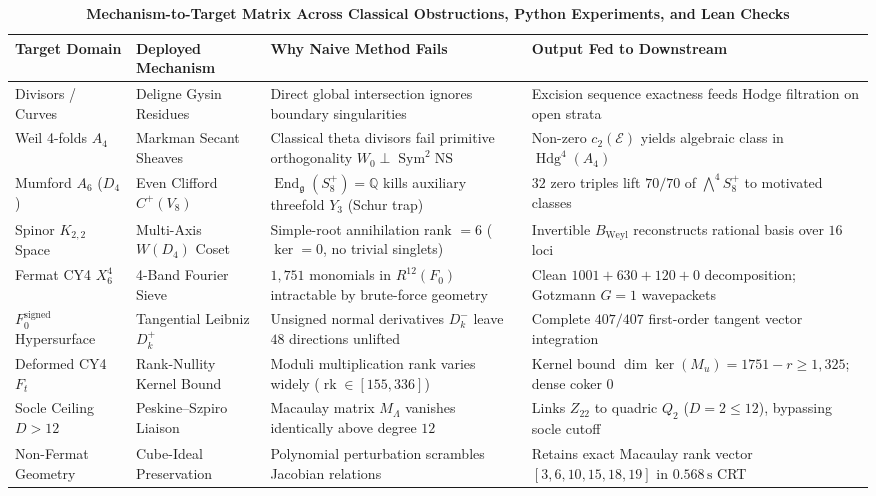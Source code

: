 \documentclass[11pt,a4paper]{article}
\theoremstyle{definition}
\theoremstyle{remark}
\DeclareMathOperator{\rk}{rk}
\DeclareMathOperator{\Sym}{Sym}
\DeclareMathOperator{\End}{End}
\DeclareMathOperator{\Hdg}{Hdg}
\begin{document}
\begin{table}[htbp]
\centering
\scriptsize
\caption{\textbf{Mechanism-to-Target Matrix Across Classical Obstructions, Python Experiments, and Lean Checks}}
\label{tab:mechanism_matrix}
\begin{tabular}{lp{3.6cm}p{4.2cm}p{4.2cm}}
\toprule
\textbf{Target Domain} & \textbf{Deployed Mechanism} & \textbf{Why Naive Method Fails} & \textbf{Output Fed to Downstream} \\
\midrule
Divisors / Curves & Deligne Gysin Residues & Direct global intersection ignores boundary singularities & Excision sequence exactness feeds Hodge filtration on open strata \\
Weil 4-folds $A_4$ & Markman Secant Sheaves & Classical theta divisors fail primitive orthogonality $W_0 \perp \Sym^2\mathrm{NS}$ & Non-zero $c_2(\mathcal{E})$ yields algebraic class in $\Hdg^4(A_4)$ \\
Mumford $A_6$ ($D_4$) & Even Clifford $C^+(V_8)$ & $\End_{\mathfrak{g}}(S^+_8) = \mathbb{Q}$ kills auxiliary threefold $Y_3$ (Schur trap) & $32$ zero triples lift $70/70$ of $\bigwedge^4 S^+_8$ to motivated classes \\
Spinor $K_{2,2}$ Space & Multi-Axis $W(D_4)$ Coset & Simple-root annihilation rank $= 6$ ($\ker=0$, no trivial singlets) & Invertible $B_{\mathrm{Weyl}}$ reconstructs rational basis over $16$ loci \\
Fermat CY4 $X^4_6$ & 4-Band Fourier Sieve & $1,751$ monomials in $R^{12}(F_0)$ intractable by brute-force geometry & Clean $1001+630+120+0$ decomposition; Gotzmann $G=1$ wavepackets \\
$F_0^{\mathrm{signed}}$ Hypersurface & Tangential Leibniz $D_k^+$ & Unsigned normal derivatives $D_k^-$ leave $48$ directions unlifted & Complete $407/407$ first-order tangent vector integration \\
Deformed CY4 $F_t$ & Rank-Nullity Kernel Bound & Moduli multiplication rank varies widely ($\rk \in [155, 336]$) & Kernel bound $\dim\ker(M_u) = 1751 - r \ge 1,325$; dense coker $0$ \\
Socle Ceiling $D > 12$ & Peskine--Szpiro Liaison & Macaulay matrix $M_\Lambda$ vanishes identically above degree $12$ & Links $Z_{22}$ to quadric $Q_2$ ($D=2 \le 12$), bypassing socle cutoff \\
Non-Fermat Geometry & Cube-Ideal Preservation & Polynomial perturbation scrambles Jacobian relations & Retains exact Macaulay rank vector $[3,6,10,15,18,19]$ in $0.568\,\mathrm{s}$ CRT \\
\bottomrule
\end{tabular}
\end{table}
\end{document}
